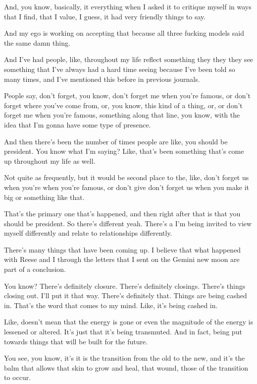 \documentclass{article}
\begin{document}
And, you know, basically, it everything when I asked it to critique
myself in ways that I find, that I value, I guess, it had very friendly
things to say.

And my ego is working on accepting that because all three fucking models
said the same damn thing.

And I've had people, like, throughout my life reflect something they
they they see something that I've always had a hard time seeing because
I've been told so many times, and I've mentioned this before in previous
journals.

People say, don't forget, you know, don't forget me when you're famous,
or don't forget where you've come from, or, you know, this kind of a
thing, or, or don't forget me when you're famous, something along that
line, you know, with the idea that I'm gonna have some type of presence.

And then there's been the number of times people are like, you should be
president. You know what I'm saying? Like, that's been something that's
come up throughout my life as well.

Not quite as frequently, but it would be second place to the, like,
don't forget us when you're when you're famous, or don't give don't
forget us when you make it big or something like that.

That's the primary one that's happened, and then right after that is
that you should be president. So there's different yeah. There's a I'm
being invited to view myself differently and relate to relationships
differently.

There's many things that have been coming up. I believe that what
happened with Reese and I through the letters that I sent on the Gemini
new moon are part of a conclusion.

You know? There's definitely closure. There's definitely closings.
There's things closing out. I'll put it that way. There's definitely
that. Things are being cashed in. That's the word that comes to my mind.
Like, it's being cashed in.

Like, doesn't mean that the energy is gone or even the magnitude of the
energy is lessened or altered. It's just that it's being transmuted. And
in fact, being put towards things that will be built for the future.

You see, you know, it's it is the transition from the old to the new,
and it's the balm that allows that skin to grow and heal, that wound,
those of the transition to occur.
\end{document}
